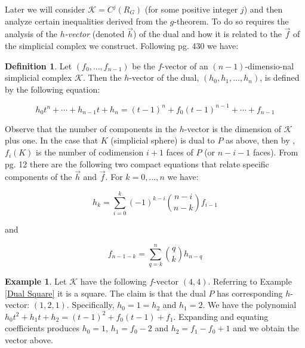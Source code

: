 \documentclass[oneside,12pt]{amsart}
\theoremstyle{definition}
\newtheorem{Definition}[Theorem]{Definition}
\newtheorem{Example}[Theorem]{Example}
\numberwithin{equation}{section}
\begin{document}
Later we will consider $\mathcal{K} = C^j(R_G)$ (for some positive integer $j$) and then analyze certain inequalities derived from the $g$-theorem.  To do so requires the analysis of the \textit{$h$-vector} (denoted $\overrightarrow{h}$) of the dual and how it is related to the $\overrightarrow{f}$ of the simplicial complex we construct.  Following \cite{DJ} pg. 430 we have:



\begin{Definition}
Let $(f_0,\ldots,f_{n-1})$ be the $f$-vector of an $(n-1)$-dimensio-nal simplicial complex $\mathcal{K}$. Then the $h$-vector of the dual, $(h_0, h_1,\ldots,h_n)$, is defined by the following equation:

$$h_0t^n + \cdots+ h_{n-1}t + h_n  = (t-1)^n + f_0(t-1)^{n-1} + \cdots + f_{n-1}$$

\end{Definition}

Observe that the number of components in the $h$-vector is the dimension of $\mathcal{K}$ plus one.  In the case that $K$ (simplicial sphere) is dual to $P$ as above, then by \cite{DJ}, $f_i(K)$ is the number of codimension $i+1$ faces of $P$ (or $n-i-1$ faces). From \cite{BP1} pg. 12 there are the following two compact equations that relate specific components of the $\overrightarrow{h}$ and $\overrightarrow{f}$.  For $k = 0,...,n$
we have:\\

\begin{center}
$$h_k = \sum_{i = 0}^k (-1)^{k-i}\binom{n-i}{n-k}f_{i-1}$$
\end{center}

and
\begin{center}
$$f_{n-1-k} = \sum_{q = k}^n \binom{q}{k}h_{n-q}$$
\end{center}

\begin{Example}

Let $\mathcal{K}$ have the following $f$-vector  $(4,4)$.  Referring to Example \ref{Dual Square} it is a square.  The claim is that the dual $P$ has corresponding $h$-vector:  $(1,2,1)$.  Specifically, $h_0 =1 = h_2$ and $h_1 =2$.  We have the polynomial $h_0t^2 + h_1t+h_2 = (t-1)^2 + f_0(t-1) + f_1$.  Expanding and equating coefficients produces $h_0 =  1$, $h_1 = f_0 -2$ and $h_2 = f_1 - f_0 +1$ and we obtain the vector above.

\end{Example}
\end{document}
